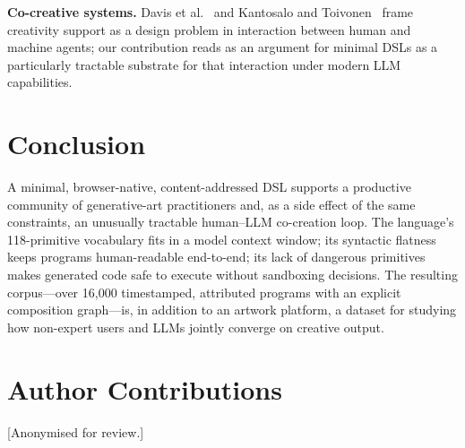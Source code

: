 \documentclass[letterpaper]{article}
\begin{document}
\textbf{Co-creative systems.} Davis et al.~ and Kantosalo and Toivonen~ frame creativity support as a design problem in interaction between human and machine agents; our contribution reads as an argument for minimal DSLs as a particularly tractable substrate for that interaction under modern LLM capabilities.

\section{Conclusion}

A minimal, browser-native, content-addressed DSL supports a productive community of generative-art practitioners and, as a side effect of the same constraints, an unusually tractable human--LLM co-creation loop. The language's 118-primitive vocabulary fits in a model context window; its syntactic flatness keeps programs human-readable end-to-end; its lack of dangerous primitives makes generated code safe to execute without sandboxing decisions. The resulting corpus---over 16{,}000 timestamped, attributed programs with an explicit composition graph---is, in addition to an artwork platform, a dataset for studying how non-expert users and LLMs jointly converge on creative output.

\section{Author Contributions}
[Anonymised for review.]



\end{document}
